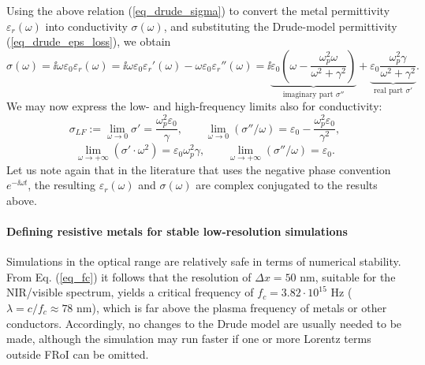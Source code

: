 Using the above relation (\ref{eq_drude_sigma}) to convert the metal permittivity $\varepsilon_r(\omega)$ into conductivity $\sigma(\omega)$, and substituting the Drude-model permittivity (\ref{eq_drude_eps_loss}), we obtain
\begin{equation} \sigma(\omega) = \ii \omega \varepsilon_0 \varepsilon_r(\omega)= \ii\omega \varepsilon_0 \varepsilon_r'(\omega)  -  \omega \varepsilon_0 \varepsilon_r''(\omega) = 
	\ii \underbrace{\varepsilon_0 \left(\omega - \frac{\omega_p^2\omega}{\omega^2+\gamma^2}\right)}_{\text{imaginary part } \sigma''}  + 
		\underbrace{\varepsilon_0\frac{\omega_p^2\gamma}{\omega^2+\gamma^2}}_{\text{real part } \sigma'}. \label{eq_drude_sigmaeps1}\end{equation}
We may now express the low- and high-frequency limits also for conductivity:
\begin{equation} \sigma_{LF} := \lim_{\omega \to 0} \sigma' = \frac{\omega_p^2\varepsilon_0}{\gamma}, \quad \quad  
				 \lim_{\omega \to 0} (\sigma'' / \omega) = \varepsilon_0 - \frac{\omega_p^2 \varepsilon_0}{\gamma^2} , \label{eq_drude_sigmalimlow}\end{equation}
\begin{equation} \lim_{\omega \to +\infty} (\sigma' \cdot \omega^2) = \varepsilon_0\omega_p^2\gamma, \quad \quad  
				 \lim_{\omega \to +\infty} (\sigma'' / \omega) = \varepsilon_0. \label{eq_drude_sigma_limup}\end{equation}
Let us note again that in the literature that uses the negative phase convention $e^{-\ii \omega t}$, the resulting $\varepsilon_r(\omega)$ and $\sigma(\omega)$ are complex conjugated to the results above. 
\paragraph{Defining resistive metals for stable low-resolution simulations} %
Simulations in the optical range are relatively safe in terms of numerical stability. From Eq. (\ref{eq_fc}) it follows that the resolution of $\Delta x = 50$ nm, suitable for the NIR/visible spectrum, yields a critical frequency of $f_c = 3.82\cdot 10^{15}$ Hz ($\lambda = c/f_c \approx 78$ nm), which is far above the plasma frequency of metals or other conductors. Accordingly, no changes to the Drude model are usually needed to be made, although the simulation may run faster if one or more Lorentz terms outside FRoI can be omitted.
 
